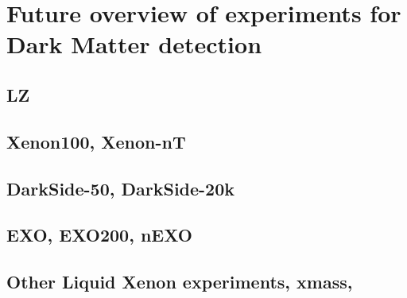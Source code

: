 \label{Chapter101}
\chapter{Future overview of experiments for Dark Matter detection}
\section{LZ}
\subsection{}
\subsection{}
\section{Xenon100, Xenon-nT}
\subsection{}
\subsection{}
\section{DarkSide-50, DarkSide-20k}
\subsection{}
\subsection{}
\section{EXO, EXO200, nEXO}
\subsection{}
\subsection{}
\section{Other Liquid Xenon experiments, xmass, }
\subsection{}
